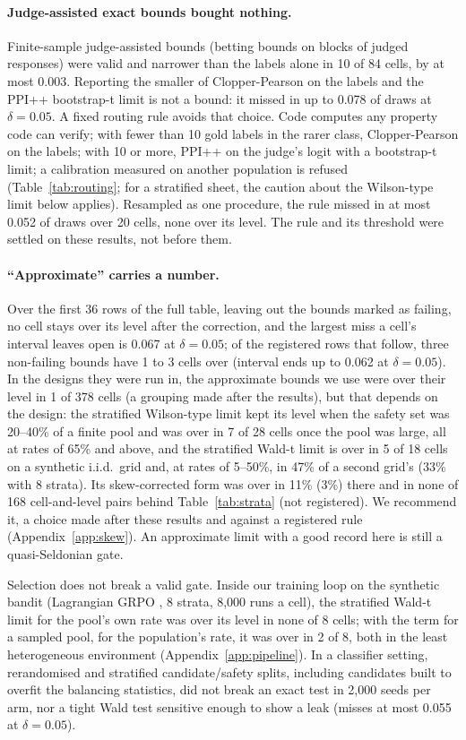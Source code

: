\documentclass[letterpaper]{article} %
\newcommand{\SWT}{stratified Wald-t limit}
\newcommand{\SWL}{stratified Wilson-type limit}
\begin{document}
\paragraph{Judge-assisted exact bounds bought nothing.} Finite-sample judge-assisted bounds (betting bounds on blocks
of judged responses) were
valid and narrower than the labels alone in 10 of 84 cells, by at most 0.003. Reporting the smaller of Clopper-Pearson
on the labels and the PPI++ bootstrap-t limit is not a bound: it missed in up to 0.078 of draws at $\delta=0.05$. A fixed routing rule avoids that choice. Code
computes any property code can verify; with fewer than 10 gold labels in the rarer class, Clopper-Pearson on the labels;
with 10 or more, PPI++ on the judge's logit with a bootstrap-t limit; a calibration measured on another population is
refused (Table~\ref{tab:routing}; for a stratified
sheet, the caution about the Wilson-type limit below applies). Resampled as one procedure, the rule missed in at most 0.052 of draws over 20 cells,
none over its level. The rule and its threshold were settled on these results, not before them.

\paragraph{``Approximate'' carries a number.} Over the first 36 rows of the full table, leaving out the bounds marked as
failing, no cell stays over its level after the correction, and the largest miss a cell's interval leaves open is 0.067
at $\delta=0.05$; of the registered rows that follow, three non-failing bounds have 1 to 3 cells over (interval ends up
to 0.062 at $\delta=0.05$). In
the designs they were run in, the approximate bounds we use were over their level in 1 of 378 cells (a grouping made
after the results), but that depends on the design: the \SWL{} kept its level when the safety set was 20--40\% of a
finite pool and was over in 7 of 28 cells once the pool was large, all at rates of 65\% and above, and the \SWT{} is
over in 5 of 18 cells on a synthetic i.i.d.\ grid and, at rates of 5--50\%, in 47\% of a second grid's (33\% with 8 strata).
Its skew-corrected form was over in 11\% (3\%) there and in none of 168 cell-and-level pairs behind
Table~\ref{tab:strata} (not registered). We recommend it, a choice made after these results and against a registered rule (Appendix~\ref{app:skew}). An approximate limit with a good record here is still a
quasi-Seldonian gate.

Selection does not break a valid gate. Inside our training loop on the synthetic bandit (Lagrangian GRPO
\citep{shao2024grpo}, 8 strata, 8,000 runs a cell), the \SWT{} for the pool's own rate was over its level in none of 8
cells; with the term for a sampled pool, for the population's rate, it was over in 2 of 8, both in the least
heterogeneous environment (Appendix~\ref{app:pipeline}). In a classifier setting, rerandomised and stratified
candidate/safety splits, including candidates built to overfit the balancing statistics, did not break an exact test in
2,000 seeds per arm, nor a tight Wald test sensitive enough to show a leak (misses at most 0.055 at $\delta=0.05$).
\end{document}
